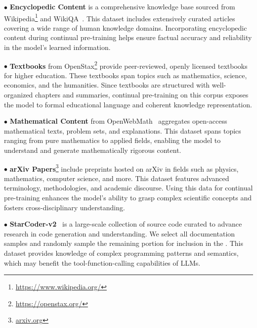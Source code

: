 \noindent$\bullet$ \textbf{Encyclopedic Content} is a comprehensive knowledge base sourced from Wikipedia\footnote{\url{https://www.wikipedia.org/}} and WikiQA~\cite{yang-etal-2015-wikiqa}. This dataset includes extensively curated articles covering a wide range of human knowledge domains. Incorporating encyclopedic content during continual pre-training helps ensure factual accuracy and reliability in the model's learned information.

\noindent$\bullet$ \textbf{Textbooks} from OpenStax\footnote{\url{https://openstax.org/}} provide peer-reviewed, openly licensed textbooks for higher education. These textbooks span topics such as mathematics, science, economics, and the humanities. Since textbooks are structured with well-organized chapters and summaries, continual pre-training on this corpus exposes the model to formal educational language and coherent knowledge representation.

\noindent$\bullet$ \textbf{Mathematical Content} from OpenWebMath~\cite{paster2024openwebmath} aggregates open-access mathematical texts, problem sets, and explanations. This dataset spans topics ranging from pure mathematics to applied fields, enabling the model to understand and generate mathematically rigorous content.

\noindent$\bullet$ \textbf{arXiv Papers}\footnote{\url{arxiv.org}} include preprints hosted on arXiv in fields such as physics, mathematics, computer science, and more. This dataset features advanced terminology, methodologies, and academic discourse. Using this data for continual pre-training enhances the model's ability to grasp complex scientific concepts and fosters cross-disciplinary understanding.

\noindent$\bullet$ \textbf{StarCoder-v2}~\cite{lozhkov2024starcoder} is a large-scale collection of source code curated to advance research in code generation and understanding. We select all documentation samples and randomly sample the remaining portion for inclusion in the \dataset. This dataset provides knowledge of complex programming patterns and semantics, which may benefit the tool-function-calling capabilities of LLMs.

